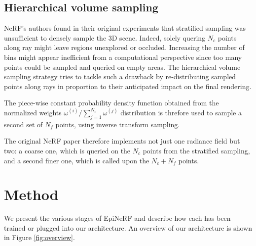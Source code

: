 \subsection{Hierarchical volume sampling}

\ac{NeRF}'s authors found in their original experiments that stratified sampling was unsufficient to densely sample the 3D scene. Indeed, solely quering $N_{c}$ points along ray might leave regions unexplored or occluded. Increasing the number of bins might appear inefficient from a computational perspective since too many points could be sampled and queried on empty areas. The hierarchical volume sampling strategy tries to tackle such a drawback by re-distributing sampled points along rays in proportion to their anticipated impact on the final rendering. 

The piece-wise constant probability density function obtained from the normalized weights $\omega^{(i)}/ \sum_{j=1}^{N_c}\omega^{(j)}$ distribution is threfore used to sample a second set of $N_f$ points, using inverse transform sampling.

The original \ac{NeRF} paper therefore implements not just one radiance field but two: a coarse one, which is queried on the $N_c$ points from the stratified sampling, and a second finer one, which is called upon the $N_{c}+N_{f}$ points. 

\section{Method}
We present the various stages of EpiNeRF and describe how each has been trained or plugged into our architecture. An overview of our architecture is shown in Figure \ref{fig:overview}.

